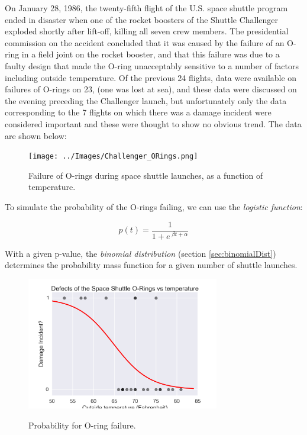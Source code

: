 On January 28, 1986, the twenty-fifth flight of the U.S. space shuttle program ended in disaster when one of the rocket boosters of the Shuttle Challenger exploded shortly after lift-off, killing all seven crew members. The presidential commission on the accident concluded that it was caused by the failure of an O-ring in a field joint on the rocket booster, and that this failure was due to a faulty design that made the O-ring unacceptably sensitive to a number of factors including outside temperature. Of the previous 24 flights, data were available on failures of O-rings on 23, (one was lost at sea), and these data were discussed on the evening preceding the Challenger launch, but unfortunately only the data corresponding to the 7 flights on which there was a damage incident were considered important and these were thought to show no obvious trend. The data are shown below:

\begin{figure}[ht]
  \centering
  \texttt{[image: ../Images/Challenger\_ORings.png]}\\
  \caption{Failure of O-rings during space shuttle launches, as a function of temperature.}
\end{figure}

To simulate the probability of the O-rings failing, we can use the \emph{logistic function}:

\begin{equation*}
  p(t) = \frac{1}{ 1 + e^{ \;\beta t + \alpha } }
\end{equation*}

With a given p-value, the \emph{binomial distribution} (section \ref{sec:binomialDist}) determines the probability mass function for a given number of shuttle launches.



\begin{figure}
  \centering
  \includegraphics[width=0.75\textwidth]{../Images/ChallengerPlain.png}\\
  \caption{Probability for O-ring failure.}
  \label{fig:challengerPlain}
\end{figure}

